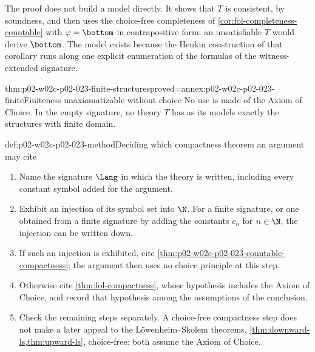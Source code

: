The proof does not build a model directly.  It shows that \(T\) is
consistent, by soundness, and then uses the choice-free completeness of
\cref{cor:fol-completeness-countable} with \(\varphi=\bottom\) in
contrapositive form: an unsatisfiable \(T\) would derive \(\bottom\).  The
model exists because the Henkin construction of that corollary runs along
one explicit enumeration of the formulas of the witness-extended signature.

\begin{hbcorollary}{thm:p02-w02c-p02-023-finite-structures}{proved=annex:p02-w02c-p02-023-finite}{Finiteness unaxiomatizable without choice}
No use is made of the Axiom of Choice.  In the empty signature, no theory
\(T\) has as its models exactly the structures with finite domain.
\end{hbcorollary}

\begin{hbmethod}{def:p02-w02c-p02-023-method}{Deciding which compactness theorem an argument may cite}
\begin{enumerate}
  \item Name the signature \(\Lang\) in which the theory is written,
        including every constant symbol added for the argument.
  \item Exhibit an injection of its symbol set into \(\N\).  For a finite
        signature, or one obtained from a finite signature by adding the
        constants \(c_n\) for \(n\in\N\), the injection can be written
        down.
  \item If such an injection is exhibited, cite
        \cref{thm:p02-w02c-p02-023-countable-compactness}; the argument then
        uses no choice principle at this step.
  \item Otherwise cite \cref{thm:fol-compactness}, whose hypothesis
        includes the Axiom of Choice, and record that hypothesis among the
        assumptions of the conclusion.
  \item Check the remaining steps separately.  A choice-free compactness
        step does not make a later appeal to the L\"owenheim--Skolem
        theorems, \cref{thm:downward-ls,thm:upward-ls}, choice-free: both
        assume the Axiom of Choice.
\end{enumerate}
\end{hbmethod}

